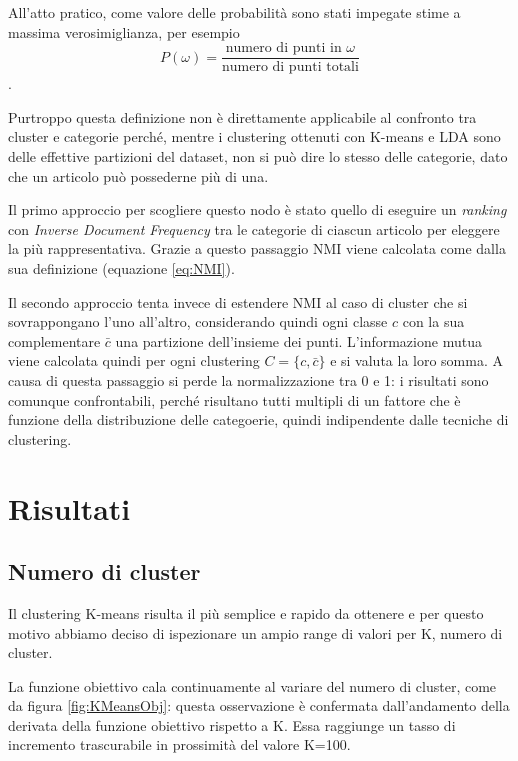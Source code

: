 \documentclass[
	12pt, %
	a4paper, %
	oneside, %
	headinclude,footinclude, %
	BCOR5mm, %
]{scrartcl}
\begin{document}
			All'atto pratico, come valore delle probabilità sono stati impegate stime a massima verosimiglianza, per esempio
			\begin{equation*}
				P(\omega) = \frac
					{ \text{numero di punti in }\omega }
					{ \text{numero di punti totali} }
			\end{equation*}.

			\bigbreak

			Purtroppo questa definizione non è direttamente applicabile al confronto tra cluster e categorie perché, mentre i clustering ottenuti con K-means e LDA sono delle effettive partizioni del dataset, non si può dire lo stesso delle categorie, dato che un articolo può possederne più di una.

			Il primo approccio per scogliere questo nodo è stato quello di eseguire un \emph{ranking} con \emph{Inverse Document Frequency} tra le categorie di ciascun articolo per eleggere la più rappresentativa.
			Grazie a questo passaggio NMI viene calcolata come dalla sua definizione (equazione \ref{eq:NMI}).

			Il secondo approccio tenta invece di estendere NMI al caso di cluster che si sovrappongano l'uno all'altro, considerando quindi ogni classe $c$ con la sua complementare $\bar{c}$ una partizione dell'insieme dei punti.
			L'informazione mutua viene calcolata quindi per ogni clustering $C = \{c, \bar{c}\}$ e si valuta la loro somma. A causa di questa passaggio si perde la normalizzazione tra 0 e 1: i risultati sono comunque confrontabili, perché risultano tutti multipli di un fattore che è funzione della distribuzione delle categoerie, quindi indipendente dalle  tecniche di clustering.

\section{Risultati}

	\subsection{Numero di cluster}
		Il clustering K-means risulta il più semplice e rapido da ottenere e per questo motivo abbiamo deciso di ispezionare un ampio range di valori per K, numero di cluster.
		
		La funzione obiettivo cala continuamente al variare del numero di cluster, come da figura \ref{fig:KMeansObj}: questa osservazione è confermata dall'andamento della derivata della funzione obiettivo rispetto a K. Essa raggiunge un tasso di incremento trascurabile in prossimità del valore K=100.
		
\end{document}
